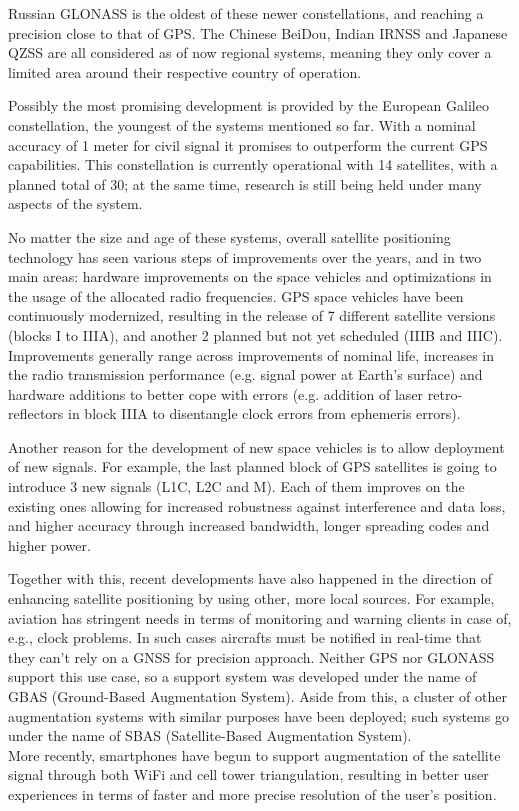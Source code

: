 Russian GLONASS is the oldest of these newer constellations, and reaching a
precision close to that of GPS. The Chinese BeiDou, Indian IRNSS and Japanese
QZSS are all considered as of now regional systems, meaning they only cover a
limited area around their respective country of operation.

\vspace{\baselineskip}

Possibly the most promising development is provided by the European Galileo
constellation, the youngest of the systems mentioned so far. With a nominal
accuracy of 1 meter for civil signal it promises to outperform the current GPS
capabilities. This constellation is currently operational with 14 satellites,
with a planned total of 30; at the same time, research is
still being held under many aspects of the system.

No matter the size and age of these systems, overall satellite positioning
technology has seen various steps of improvements over the years, and in two
main areas: hardware improvements on the space vehicles and optimizations in the
usage of the allocated radio frequencies. GPS space vehicles have been
continuously modernized, resulting in the release of 7 different satellite
versions (blocks I to IIIA), and another 2 planned but not yet scheduled (IIIB
and IIIC). Improvements generally range across improvements of nominal life,
increases in the radio transmission performance (e.g. signal power at Earth's
surface) and hardware additions to better cope with errors (e.g. addition of
laser retro-reflectors in block IIIA to disentangle clock errors from ephemeris
errors). 

Another reason for the development of new space vehicles is to allow
deployment of new signals. For example, the last planned block of GPS satellites
is going to introduce 3 new signals (L1C, L2C and M). Each of them improves
on the existing ones allowing for increased robustness against interference
and data loss, and higher accuracy through increased bandwidth, longer spreading
codes and higher power.

\vspace{\baselineskip}

Together with this, recent developments have also happened in the direction of
enhancing satellite positioning by using other, more local sources. For example,
aviation has stringent needs in terms of monitoring and warning clients in case
of, e.g., clock problems. In such cases aircrafts must be notified in real-time
that they can't rely on a GNSS for precision approach. Neither GPS nor GLONASS
support this use case, so a support system was developed under the name of GBAS
(Ground-Based Augmentation System). Aside from this, a cluster of other
augmentation systems with similar purposes have been deployed; such systems go
under the name of SBAS (Satellite-Based Augmentation System).\\
More recently, smartphones have begun to support augmentation of the satellite
signal through both WiFi and cell tower triangulation, resulting in better user
experiences in terms of faster and more precise resolution of the user's
position.

